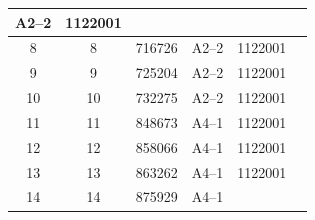 \documentclass[UTF8,10pt,a4paper,fontset=fandol]{ctexart}
\newcommand{\fieldvalue}[1]{#1}
\begin{document}
\begin{center}
\begin{tabularx}{\textwidth}{|c|c|c|c|c|X|}
\fieldvalue{A2--2} &
\fieldvalue{1122001} & \\
\hline
8 &
\fieldvalue{8} &
\fieldvalue{716726} &
\fieldvalue{A2--2} &
\fieldvalue{1122001} & \\
\hline
9 &
\fieldvalue{9} &
\fieldvalue{725204} &
\fieldvalue{A2--2} &
\fieldvalue{1122001} & \\
\hline
10 &
\fieldvalue{10} &
\fieldvalue{732275} &
\fieldvalue{A2--2} &
\fieldvalue{1122001} & \\
\hline
11 &
\fieldvalue{11} &
\fieldvalue{848673} &
\fieldvalue{A4--1} &
\fieldvalue{1122001} & \\
\hline
12 &
\fieldvalue{12} &
\fieldvalue{858066} &
\fieldvalue{A4--1} &
\fieldvalue{1122001} & \\
\hline
13 &
\fieldvalue{13} &
\fieldvalue{863262} &
\fieldvalue{A4--1} &
\fieldvalue{1122001} & \\
\hline
14 &
\fieldvalue{14} &
\fieldvalue{875929} &
\fieldvalue{A4--1} &

\end{tabularx}
\end{center}
\end{document}

